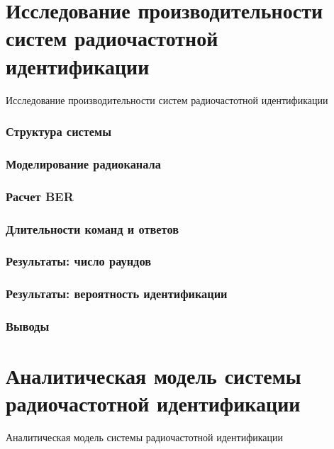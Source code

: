 \section{Исследование производительности систем радиочастотной идентификации}
\begin{frame}
    \begin{center}
        \Huge
        Исследование производительности систем радиочастотной идентификации
    \end{center}
\end{frame}

\begin{frame}
    \frametitle{Структура системы}
\end{frame}


\begin{frame}
    \frametitle{Моделирование радиоканала}
\end{frame}

\begin{frame}
    \frametitle{Расчет BER}
\end{frame}


\begin{frame}
    \frametitle{Длительности команд и ответов}
\end{frame}

\begin{frame}
    \frametitle{Результаты: число раундов}
\end{frame}

\begin{frame}[allowframebreaks]
    \frametitle{Результаты: вероятность идентификации}
\end{frame}

\begin{frame}
    \frametitle{Выводы}
\end{frame}



\section{Аналитическая модель системы радиочастотной идентификации}
\begin{frame}
    \begin{center}
        \Huge
        Аналитическая модель системы радиочастотной идентификации
    \end{center}
\end{frame}

